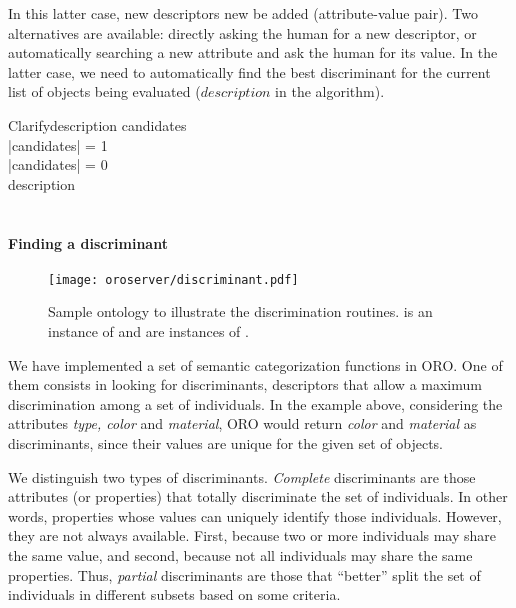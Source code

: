In this latter case, new descriptors new be added (attribute-value pair). Two
alternatives are available: directly asking the human for a new descriptor, or
automatically searching a new attribute and ask the human for its value. In the
latter case, we need to automatically find the best discriminant for the
current list of objects being evaluated ($description$ in the algorithm).


\small
\begin{pseudocode}[ruled]{Clarify}{description}
\label{algo|clarify}
\BEGIN
candidates \GETS {} \\
\IF \left|{candidates}\right| = 1 \THEN {} \\
\ELSEIF \left|{candidates}\right| = 0 \THEN {} \\
\ELSE
    \BEGIN
        description \GETS {} \\
         \\
    \END
\END

\end{pseudocode}
\normalsize

\paragraph{Finding a discriminant}
\label{sect|discriminant}

\begin{figure}
    \centering
    \texttt{[image: oroserver/discriminant.pdf]}
    \caption{Sample ontology to illustrate the discrimination routines.
     is an instance of  and
     are instances of .}
    \label{fig|discriminant}
\end{figure}

We have implemented a set of semantic categorization functions in ORO. One of
them consists in looking for discriminants, \ie descriptors that allow a
maximum discrimination among a set of individuals. In the example above,
considering the attributes \emph{type, color} and \emph{material}, ORO would
return \emph{color} and \emph{material} as discriminants, since their values
are unique for the given set of objects.

We distinguish two types of discriminants. \emph{Complete} discriminants are
those attributes (or properties) that totally discriminate the set of
individuals. In other words, properties whose values can uniquely identify
those individuals. However, they are not always available. First, because two
or more individuals may share the same value, and second, because not all
individuals may share the same properties. Thus, \emph{partial} discriminants
are those that ``better'' split the set of individuals in different subsets
based on some criteria.

